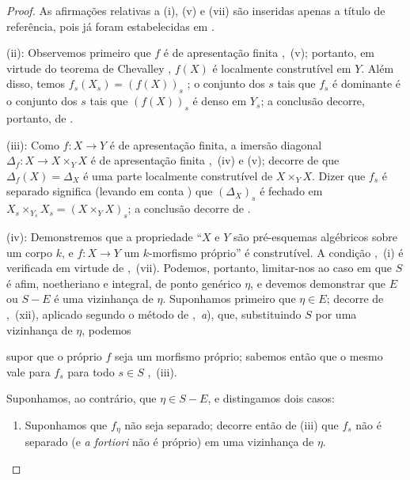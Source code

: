 \begin{proof}
As afirmações relativas a (i), (v) e (vii) são inseridas apenas a título de referência, pois já foram estabelecidas em .

(ii): Observemos primeiro que $f$ é de apresentação finita ,~(v); portanto, em virtude do teorema de Chevalley , $f(X)$ é localmente construtível em $Y$.
Além disso, temos $f_s(X_s)=(f(X))_s$ ; o conjunto dos $s$ tais que $f_s$ é dominante é o conjunto dos $s$ tais que $(f(X))_s$ é denso em $Y_s$; a conclusão decorre, portanto, de .

(iii): Como $f:X\to Y$ é de apresentação finita, a imersão diagonal $\Delta_f:X\to X\times_Y X$ é de apresentação finita ,~(iv) e (v); decorre de  que $\Delta_f(X)=\Delta_X$ é uma parte localmente construtível de $X\times_Y X$.
Dizer que $f_s$ é separado significa \textnormal{(}levando em conta \textnormal{)} que $(\Delta_X)_s$ é fechado em $X_s\times_{Y_s} X_s=(X\times_Y X)_s$; a conclusão decorre de .

(iv): Demonstremos que a propriedade ``$X$ e $Y$ são pré-esquemas algébricos sobre um corpo $k$, e $f:X\to Y$ um $k$-morfismo próprio'' é construtível.
A condição ,~(i) é verificada em virtude de ,~(vii).
Podemos, portanto, limitar-nos ao caso em que $S$ é afim, noetheriano e integral, de ponto genérico $\eta$, e devemos demonstrar que $E$ ou $S-E$ é uma vizinhança de $\eta$.
Suponhamos primeiro que $\eta\in E$; decorre de ,~(xii), aplicado segundo o método de ,~\emph{a}), que, substituindo $S$ por uma vizinhança de $\eta$, podemos


supor que o próprio $f$ seja um morfismo próprio; sabemos então que o mesmo vale para $f_s$ para todo $s\in S$ ,~(iii).

Suponhamos, ao contrário, que $\eta\in S-E$, e distingamos dois casos:
\begin{enumerate}[label=\upshape{$\arabic{enumi}^\circ$}]
  \item Suponhamos que $f_\eta$ não seja separado; decorre então de (iii) que $f_s$ não é separado (e \emph{a fortiori} não é próprio) em uma vizinhança de $\eta$.


\end{enumerate}
\end{proof}
